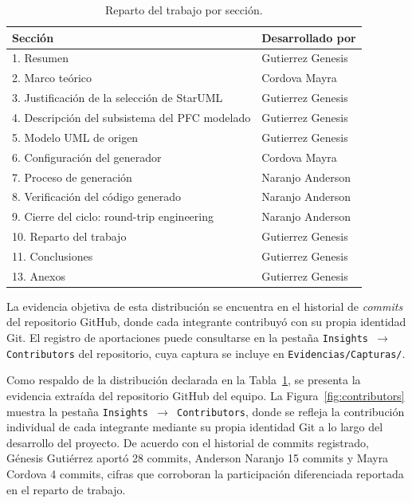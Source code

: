 \documentclass[journal,onecolumn]{IEEEtran}
\begin{document}
\begin{table}[H]
	\centering
	\caption{Reparto del trabajo por sección.}
	\label{tab:reparto_trabajo}
	\begin{tabular}{|p{9cm}|l|}
		\hline
		\textbf{Sección} & \textbf{Desarrollado por} \\
		\hline
		1. Resumen & Gutierrez Genesis \\
		\hline
		2. Marco teórico & Cordova Mayra \\
		\hline
		3. Justificación de la selección de StarUML & Gutierrez Genesis \\
		\hline
		4. Descripción del subsistema del PFC modelado & Gutierrez Genesis \\
		\hline
		5. Modelo UML de origen & Gutierrez Genesis \\
		\hline
		6. Configuración del generador & Cordova Mayra \\
		\hline
		7. Proceso de generación & Naranjo Anderson \\
		\hline
		8. Verificación del código generado & Naranjo Anderson \\
		\hline
		9. Cierre del ciclo: round-trip engineering & Naranjo Anderson \\
		\hline
		10. Reparto del trabajo & Gutierrez Genesis \\
		\hline
		11. Conclusiones & Gutierrez Genesis \\
		\hline
		13. Anexos & Gutierrez Genesis \\
		\hline
	\end{tabular}
\end{table}

La evidencia objetiva de esta distribución se encuentra en el historial de \textit{commits} del repositorio GitHub, donde cada integrante contribuyó con su propia identidad Git. El registro de aportaciones puede consultarse en la pestaña \texttt{Insights $\rightarrow$ Contributors} del repositorio, cuya captura se incluye en \texttt{Evidencias/Capturas/}.

Como respaldo de la distribución declarada en la Tabla~\ref{tab:reparto_trabajo}, se presenta la evidencia extraída del repositorio GitHub del equipo. La Figura~\ref{fig:contributors} muestra la pestaña \texttt{Insights $\rightarrow$ Contributors}, donde se refleja la contribución individual de cada integrante mediante su propia identidad Git a lo largo del desarrollo del proyecto. De acuerdo con el historial de commits registrado, Génesis Gutiérrez aportó 28 commits, Anderson Naranjo 15 commits y Mayra Cordova 4 commits, cifras que corroboran la participación diferenciada reportada en el reparto de trabajo.
\end{document}
